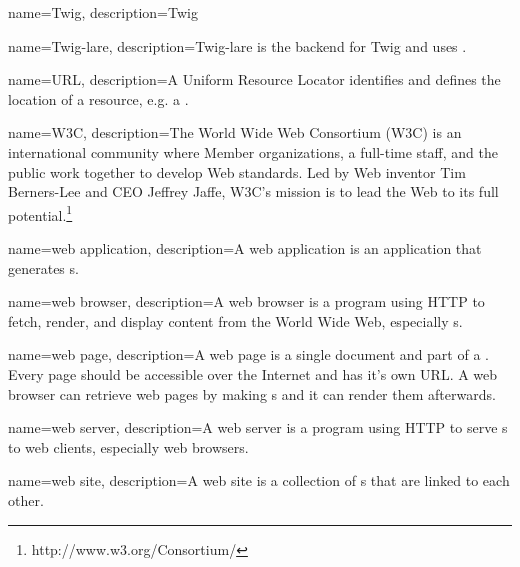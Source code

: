 {
  name=Twig,
  description={Twig}
}

{
  name=Twig-lare,
  description={Twig-lare is the \lare{} backend for Twig and uses \phpLare{}.}
}

{
  name=URL,
  description={A Uniform Resource Locator identifies and defines the location of a resource, e.g. a \webPage{}.}
}

{
  name=W3C,
  description={The World Wide Web Consortium (W3C) is an international community where Member organizations, a full-time staff, and the public work together to develop Web standards. Led by Web inventor Tim Berners-Lee and CEO Jeffrey Jaffe, W3C's mission is to lead the Web to its full potential.\footnote{http://www.w3.org/Consortium/}}
}

{
  name=web application,
  description={A web application is an application that generates \webPage{}s.}
}

{
  name=web browser,
  description={A web browser is a program using HTTP to fetch, render, and display content from the World Wide Web, especially \webPage{}s.}
}

{
  name=web page,
  description={A web page is a single document and part of a \webSite{}. 
  Every page should be accessible over the Internet and has it's own URL.
  A web browser can retrieve web pages by making \httpRequest{}s and it can render them afterwards.}
}

{
  name=web server,
  description={A web server is a program using HTTP to serve \webPage{}s to web clients, especially web browsers.}
}

{
  name=web site,
  description={A web site is a collection of \webPage{}s that are linked to each other.}
}

